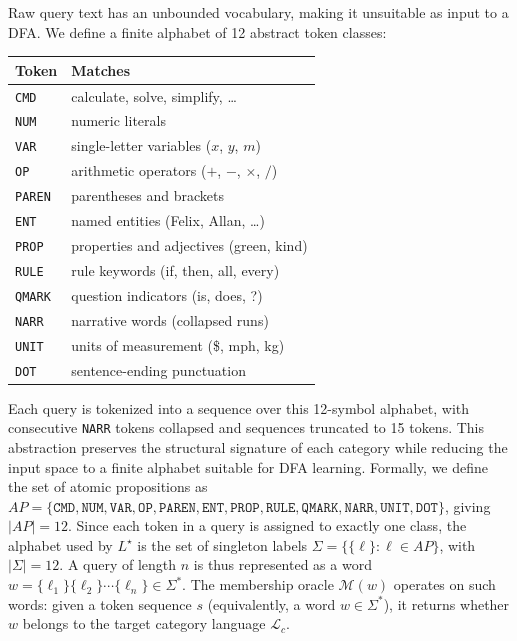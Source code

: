 \documentclass[journal]{IEEEtai}
\newcommand{\AP}{AP}
\begin{document}
Raw query text has an unbounded vocabulary, making it unsuitable as input to a DFA. We define a finite alphabet of 12 abstract token classes:
\begin{center}
\small
\begin{tabular}{ll}
\textbf{Token} & \textbf{Matches} \\
\hline
\texttt{CMD} & calculate, solve, simplify, \ldots \\
\texttt{NUM} & numeric literals \\
\texttt{VAR} & single-letter variables ($x$, $y$, $m$) \\
\texttt{OP} & arithmetic operators ($+$, $-$, $\times$, $/$) \\
\texttt{PAREN} & parentheses and brackets \\
\texttt{ENT} & named entities (Felix, Allan, \ldots) \\
\texttt{PROP} & properties and adjectives (green, kind) \\
\texttt{RULE} & rule keywords (if, then, all, every) \\
\texttt{QMARK} & question indicators (is, does, ?) \\
\texttt{NARR} & narrative words (collapsed runs) \\
\texttt{UNIT} & units of measurement (\$, mph, kg) \\
\texttt{DOT} & sentence-ending punctuation \\
\end{tabular}
\end{center}

Each query is tokenized into a sequence over this 12-symbol alphabet, with consecutive \texttt{NARR} tokens collapsed and sequences truncated to 15 tokens. This abstraction preserves the structural signature of each category while reducing the input space to a finite alphabet suitable for DFA learning. Formally, we define the set of atomic propositions as $\AP = \{\texttt{CMD}, \texttt{NUM}, \texttt{VAR}, \texttt{OP}, \texttt{PAREN}, \texttt{ENT}, \texttt{PROP}, \texttt{RULE}, \texttt{QMARK}, \texttt{NARR}, \texttt{UNIT}, \texttt{DOT}\}$, giving $|\AP| = 12$. Since each token in a query is assigned to exactly one class, the alphabet used by $L^\star$ is the set of singleton labels $\Sigma = \{\{\ell\} : \ell \in \AP\}$, with $|\Sigma| = 12$. A query of length $n$ is thus represented as a word $w = \{\ell_1\}\{\ell_2\}\cdots\{\ell_n\} \in \Sigma^*$. The membership oracle $\mathcal{M}(w)$ operates on such words: given a token sequence $s$ (equivalently, a word $w \in \Sigma^*$), it returns whether $w$ belongs to the target category language $\mathcal{L}_c$.
\end{document}
